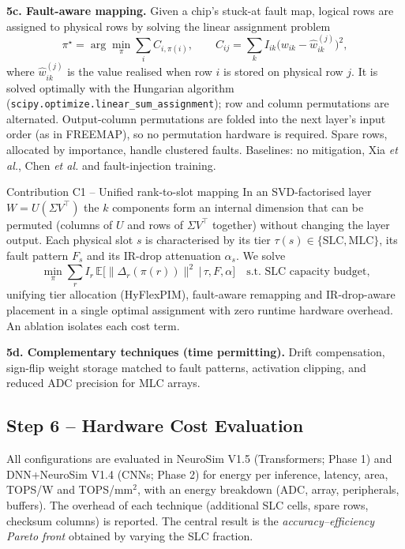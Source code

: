 \documentclass[10pt,a4paper]{article}
\begin{document}
\textbf{5c. Fault-aware mapping.} Given a chip's stuck-at fault map, logical rows are assigned to
physical rows by solving the linear assignment problem
\begin{equation}
\pi^\star=\arg\min_\pi\sum_i C_{i,\pi(i)},\qquad C_{ij}=\sum_k I_{ik}\big(w_{ik}-\hat w^{(j)}_{ik}\big)^2,
\end{equation}
where $\hat w^{(j)}_{ik}$ is the value realised when row $i$ is stored on physical row $j$. It is solved
optimally with the Hungarian algorithm (\texttt{scipy.optimize.linear\_sum\_assignment}); row and column
permutations are alternated. Output-column permutations are folded into the next layer's input order (as
in FREEMAP), so no permutation hardware is required. Spare rows, allocated by importance, handle
clustered faults. Baselines: no mitigation, Xia \emph{et al.}, Chen \emph{et al.} and fault-injection
training.

\begin{contribbox}{Contribution C1 -- Unified rank-to-slot mapping}
In an SVD-factorised layer $W=U(\Sigma V^{\top})$ the $k$ components form an internal dimension that can be
permuted (columns of $U$ and rows of $\Sigma V^{\top}$ together) without changing the layer output. Each
physical slot $s$ is characterised by its tier $\tau(s)\in\{\mathrm{SLC},\mathrm{MLC}\}$, its fault
pattern $F_s$ and its IR-drop attenuation $\alpha_s$. We solve
\[
\min_\pi\sum_r I_r\,\mathbb E\big[\|\Delta_r(\pi(r))\|^2\,\big|\,\tau,F,\alpha\big]\quad
\text{s.t. SLC capacity budget,}
\]
unifying tier allocation (HyFlexPIM), fault-aware remapping and IR-drop-aware placement in a single optimal
assignment with zero runtime hardware overhead. An ablation isolates each cost term.
\end{contribbox}

\textbf{5d. Complementary techniques (time permitting).} Drift compensation, sign-flip weight storage
matched to fault patterns, activation clipping, and reduced ADC precision for MLC arrays.

\subsection{Step 6 -- Hardware Cost Evaluation}
All configurations are evaluated in NeuroSim V1.5 (Transformers; Phase 1) and DNN+NeuroSim V1.4 (CNNs;
Phase 2) for energy per inference, latency, area, TOPS/W and TOPS/mm$^2$, with an energy breakdown (ADC,
array, peripherals, buffers). The overhead of each technique (additional SLC cells, spare rows, checksum
columns) is reported. The central result is the \emph{accuracy--efficiency Pareto front} obtained by
varying the SLC fraction.
\end{document}

